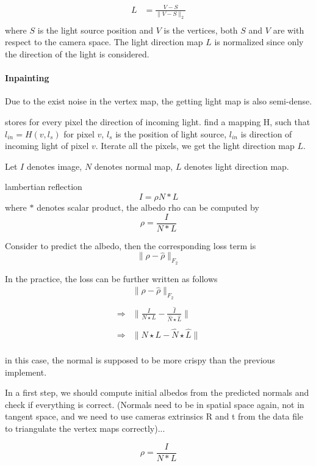 \begin{equation}\label{light-direction}
	\begin{array}{ll}
		L&= \frac{V-S}{\|V-S\|_2}\\ 
	\end{array}
\end{equation}
where $ S $ is the light source position and $ V $ is the vertices, both $ S $ and  $ V $ are with respect to the camera space. The light direction map $ L $ is normalized since only the direction of the light is considered. 

\paragraph{Inpainting}
Due to the exist noise in the vertex map, the getting light map is also semi-dense.

stores for every pixel the direction of incoming light.
find a mapping H, such that $ l_{in} = H(v, l_{s}) $ for pixel $ v $, $ l_s $ is the position of light source, $ l_{in} $ is direction of incoming light of pixel $ v $. Iterate all the pixels, we get the light direction map $ L $.

Let $ I $ denotes image, $ N $ denotes normal map, $ L $ denotes light direction map.

lambertian reflection
\[I = \rho N*L\]
where $ * $ denotes scalar product,
the albedo rho can be computed by 
\[\rho = \frac{I}{N*L}\]

Consider to predict the albedo, then the corresponding loss term is 
\[\|\rho-\hat\rho \|_{F_2}\]

In the practice, the loss can be further written as follows
\begin{equation}
	\begin{array}{cc}
		&\|\rho-\hat\rho \|_{F_2}\\
		\\
		\Rightarrow &  \| \frac{I}{N\star L} - \frac{\hat I}{\hat N \star \hat L} \|\\
		\\
		\Rightarrow &  \| N\star L - \hat N \star \hat L \|\\
	\end{array}
\end{equation}

in this case, the normal is supposed to be more crispy than the previous implement.

In a first step, we should compute initial albedos from the predicted
normals and check if everything is correct. (Normals need to be in
spatial space again, not in tangent space, and we need to use cameras
extrinsics R and t from the data file to triangulate the vertex maps
correctly)...

\[\rho = \frac{I}{N*L}\]




